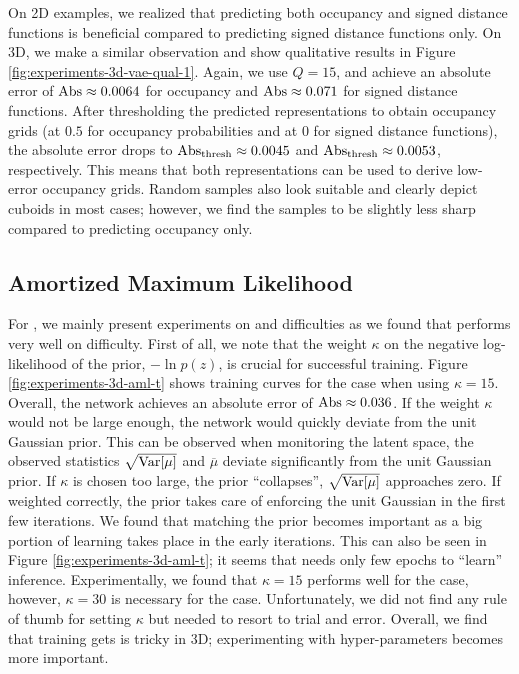 On 2D examples, we realized that predicting both occupancy and signed
distance functions is beneficial compared to predicting signed distance functions
only. On 3D, we make a similar observation and show qualitative results
in Figure \ref{fig:experiments-3d-vae-qual-1}. Again, we use $Q = 15$,
and achieve an absolute error of $\text{Abs} \approx 0.0064$ for occupancy and
$\text{Abs} \approx 0.071$ for signed distance functions. After thresholding the
predicted representations to obtain occupancy grids (at $0.5$ for occupancy
probabilities and at $0$ for signed distance functions), the absolute error
drops to $\AbsThr \approx 0.0045$ and $\AbsThr \approx 0.0053$, respectively.
This means that both representations can be used to derive low-error
occupancy grids. Random samples also look suitable and clearly depict cuboids in
most cases; however, we find the samples to be slightly less sharp compared to
predicting occupancy only.

\subsection{Amortized Maximum Likelihood}
\label{sec:experiments-3d-aml}





For \AML, we mainly present experiments on \moderate and \hard difficulties
as we found that \AML performs very well on \moderate difficulty.
First of all, we note that the weight $\kappa$ on the negative log-likelihood of the prior, \ie
$- \ln p(z)$, is crucial for successful training. 
Figure \ref{fig:experiments-3d-aml-t} shows training curves for the \moderate case
when using $\kappa = 15$. Overall, the network achieves an absolute error of
$\text{Abs} \approx 0.036$. If the weight $\kappa$ would not be large enough,
the network would quickly deviate from the unit Gaussian prior.
This can be observed
when monitoring the latent space, \ie the observed statistics $\sqrt{\mathrm{Var}[\mu]}$ and $\overline{\mu}$
deviate significantly from the unit Gaussian prior. If $\kappa$ is chosen too large, the prior
``collapses'', \ie $\sqrt{\mathrm{Var}[\mu]}$ approaches zero. If weighted
correctly, the prior takes care of enforcing the unit Gaussian in the first few iterations.
We found that matching the prior becomes important as a big portion of learning
takes place in the early iterations. This can also be seen in Figure
\ref{fig:experiments-3d-aml-t}; it seems that \AML needs only few epochs to
``learn'' inference.
Experimentally, we found that $\kappa = 15$ performs
well for the \moderate case, however, $\kappa = 30$ is necessary for the \hard case.
Unfortunately, we did not find any rule of thumb for setting $\kappa$ but needed to
resort to trial and error.
Overall, we find that training \AML gets is tricky in 3D;
experimenting with hyper-parameters becomes more important.

